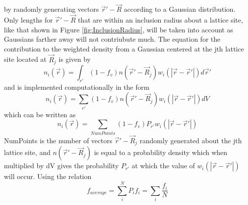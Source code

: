 \documentclass[double,12pt]{beavtex}
\begin{document}
%
by randomly generating vectors
$\vec r' -\vec R$ according to a Gaussian distribution. 
Only lengths for $\vec r'- \vec R$ that are within an inclusion radius
about a lattice site, like that shown in Figure \ref{fig:InclusionRadius}, 
will be taken into account as Gaussians 
farther away will not contriubute much.
The equation for the contribution to the weighted density from a 
Gaussian centered at the jth lattice site located at $\vec R_j$ is given by
\begin{equation}{n_i(\vec r)= \int_{r'}{(1-f_v)n(\vec r' - \vec R_j)w_i(|\vec{r}-\vec{r}'|)} {d}\vec{r}'}\end{equation} 
and is implemented computationally in the form
\begin{equation}{n_i(\vec r)= \sum_{r'}{(1-f_v)n(\vec r' -\vec R_j)w_i(|\vec{r}-\vec{r}'|)dV}}\end{equation} 
which can be written as
\begin{equation}{n_i(\vec r)= \sum_{NumPoints}(1-f_v)P_{r'}w_i(|\vec{r}-\vec{r}'|)}\end{equation} 
NumPoints is the number of vectors $\vec r' - \vec R_j$ randomly generated about the jth lattice site, 
and $n(\vec r' - \vec R_j)$
is equal to a probability density 
which when multiplied by dV gives the probability $P_{r'}$ at which the value of 
$w_i(|\vec{r}-\vec{r}'|)$ will occur. 
Using the relation
\begin{displaymath}{f_{average}=\sum_i^N{P_if_i}=\sum_i{\frac{f_i}{N}}}\end{displaymath} 
\end{document}

